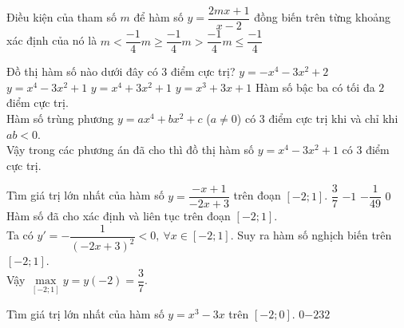 \begin{ex}%
Điều kiện của tham số $m$ để hàm số $y=\dfrac{2mx+1}{x-2}$ đồng biến trên từng khoảng xác định của nó là
	\choice
	{\True $m<\dfrac{-1}{4}$}{$m\ge \dfrac{-1}{4}$}{$m>\dfrac{-1}{4}$}{$m\le \dfrac{-1}{4}$}
\end{ex}

\begin{ex}%
Đồ thị hàm số nào dưới đây có $3$ điểm cực trị?
\choice
{$y=-x^4-3x^2+2$}
{\True $y=x^4-3x^2+1$}
{$y=x^4+3x^2+1$}
{$y=x^3+3x+1$}
\loigiai
{Hàm số bậc ba có tối đa $2$ điểm cực trị.\\
Hàm số trùng phương $y=ax^4+bx^2+c$ ($a\neq 0$) có $3$ điểm cực trị khi và chỉ khi $ab<0$.\\
Vậy trong các phương án đã cho thì đồ thị hàm số $y=x^4-3x^2+1$ có $3$ điểm cực trị.
}
\end{ex}

\begin{ex}%
Tìm giá trị lớn nhất của hàm số $y=\dfrac{-x+1}{-2x+3}$ trên đoạn $[-2;1]$.
\choice
{\True $\dfrac{3}{7}$}
{$-1$}
{$-\dfrac{1}{49}$}
{$0$}
\loigiai
{Hàm số đã cho xác định và liên tục trên đoạn $[-2;1]$.\\
Ta có $y'=-\dfrac{1}{(-2x+3)^2}<0,\ \forall x \in [-2;1]$. Suy ra hàm số nghịch biến trên $[-2;1]$.\\
Vậy $\max\limits_{[-2;1]} y=y(-2)=\dfrac{3}{7}$.
}
\end{ex}

\begin{ex}%
	Tìm giá trị lớn nhất của hàm số $y=x^3-3x$ trên $[-2;0]$.
	\choice
	{$0$}{$-2$}{$3$}{\True $2$}
\end{ex}

